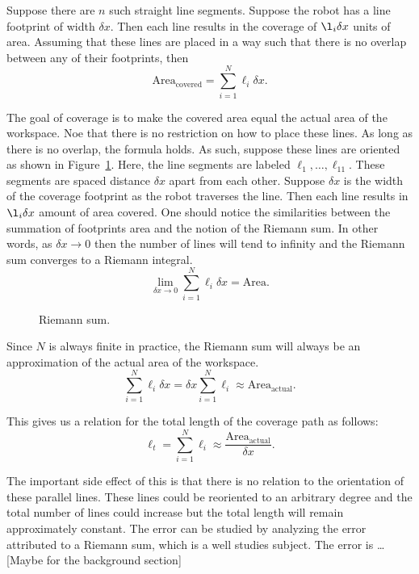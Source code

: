 \documentclass[../main.tex]{subfiles}
\begin{document}
Suppose there are $n$ such straight line segments. Suppose the robot has a line footprint of width $\delta x$. Then each line results in the coverage of $\l_i\delta x$ units of area. Assuming that these lines are placed in a way such that there is no overlap between any of their footprints, then 
\begin{equation}
	\text{Area}_{\text{covered}}=\sum_{i=1}^N\ell_i\delta x.%
\end{equation}

The goal of coverage is to make the covered area equal the actual area of the workspace. Noe that there is no restriction on how to place these lines. As long as there is no overlap, the formula holds. As such, suppose these lines are oriented as shown in Figure~\ref{fig:riemann_sum}. Here, the line segments are labeled $\ell_1,\ldots,\ell_{11}$. These segments are spaced distance $\delta x$ apart from each other. Suppose $\delta x$ is the width of the coverage footprint as the robot traverses the line. Then each line results in $\l_i\delta x$ amount of area covered. One should notice the similarities between the summation of footprints area and the notion of the Riemann sum. In other words, as $\delta x\to 0$ then the number of lines will tend to infinity and the Riemann sum converges to a Riemann integral.
\begin{equation}
	\lim_{\delta x\to 0} \sum_{i=1}^N\ell_i\delta x = \text{Area}.
\end{equation}

\begin{figure}
	\centering
	
	\caption{Riemann sum.}
	\label{fig:riemann_sum}
\end{figure}

Since $N$ is always finite in practice, the Riemann sum will always be an approximation of the actual area of the workspace. 
\begin{equation}
	\sum_{i=1}^N \ell_i\delta x=\delta x\sum_{i=1}^N\ell_i\approx\text{Area}_{\text{actual}}.
\end{equation}

This gives us a relation for the total length of the coverage path as follows:
\begin{equation}
	\ell_t=\sum_{i=1}^N\ell_i\approx\frac{\text{Area}_{\text{actual}}}{\delta x}.
\end{equation}

The important side effect of this is that there is no relation to the orientation of these parallel lines. These lines could be reoriented to an arbitrary degree and the total number of lines could increase but the total length will remain approximately constant. 
The error can be studied by analyzing the error attributed to a Riemann sum, which is a well studies subject. The error is \ldots [Maybe for the background section]
\end{document}
